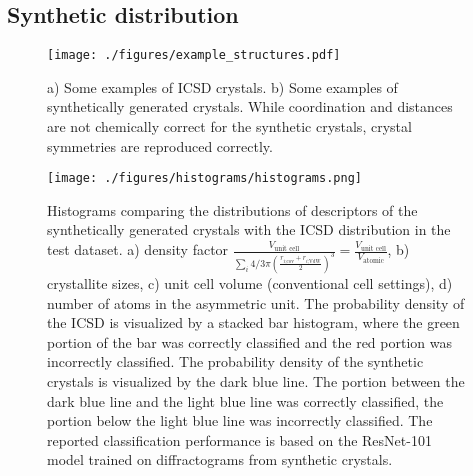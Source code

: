 



    \subsection{Synthetic distribution} \label{sec:synth_distribution}

    \begin{figure}[!htb]
    \centering
    \texttt{[image: ./figures/example\_structures.pdf]}
    \caption{a) Some  examples of ICSD crystals. b) Some  examples of synthetically generated crystals. While coordination and
    distances are not chemically correct for the synthetic crystals, crystal
    symmetries are reproduced correctly.}
    \label{fig:example_structures}
    \end{figure}

    \begin{figure}[!htb]
    \centering
    \texttt{[image: ./figures/histograms/histograms.png]} 
    \caption{Histograms comparing the distributions of descriptors of the
    synthetically generated crystals with the ICSD distribution in the test
    dataset. a) density factor $ \frac{V_\text{unit cell}}{\sum_i 4/3 \pi
    \left(\frac{r_{i\text{;cov}} + r_{i\text{;VdW}}}{2}\right)^3} =
    \frac{V_\text{unit cell}}{V_\text{atomic}}$, b) crystallite sizes, c) unit cell
    volume (conventional cell settings), d) number of atoms in the asymmetric
    unit. The probability density of the ICSD is visualized by a stacked bar
    histogram, where the green portion of the bar was correctly classified and
    the red portion was incorrectly classified. The probability density of the
    synthetic crystals is visualized by the dark blue line. The portion between the
    dark blue line and the light blue line was correctly classified, the portion below the
    light blue line was incorrectly classified. The reported classification
    performance is based on the ResNet-101 model trained on diffractograms from
    synthetic crystals.}
    \label{fig:histograms}
    \end{figure}

